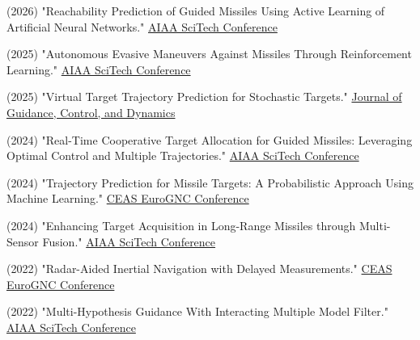 \documentclass[11pt,a4paper]{article}
\begin{document}
\begin{enumerate}[label=\textbf{[\arabic*]}, leftmargin=0.8cm, itemsep=3pt]

    \item (2026) "Reachability Prediction of Guided Missiles Using Active Learning of Artificial Neural Networks." \href{https://arc.aiaa.org/doi/abs/10.2514/6.2026-2166}{AIAA SciTech Conference}
    
    \item (2025) "Autonomous Evasive Maneuvers Against Missiles Through Reinforcement Learning." \href{https://www.researchgate.net/publication/387995943_Autonomous_Evasive_Maneuvers_against_Missiles_through_Reinforcement_Learning}{AIAA SciTech Conference}

    \item (2025) "Virtual Target Trajectory Prediction for Stochastic Targets." \href{https://arxiv.org/pdf/2504.01851}{Journal of Guidance, Control, and Dynamics}
    
    \item (2024) "Real-Time Cooperative Target Allocation for Guided Missiles: Leveraging Optimal Control and Multiple Trajectories." \href{https://arc.aiaa.org/doi/10.2514/6.2025-1907}{AIAA SciTech Conference}

    \item (2024) "Trajectory Prediction for Missile Targets: A Probabilistic Approach Using Machine Learning." \href{https://www.researchgate.net/publication/381520100_Trajectory_Prediction_for_Missile_Targets_A_Probabilistic_Approach_Using_Machine_Learning}{CEAS EuroGNC Conference}
    
    
    \item (2024) "Enhancing Target Acquisition in Long-Range Missiles through Multi-Sensor Fusion." \href{https://www.researchgate.net/publication/377395801_Enhancing_Target_Acquisition_in_Long-Range_Missiles_through_Multi-Sensor_Fusion}{AIAA SciTech Conference}
    
    \item (2022) "Radar-Aided Inertial Navigation with Delayed Measurements." \href{https://www.researchgate.net/publication/360484762_Radar-Aided_Inertial_Navigation_with_Delayed_Measurements}{CEAS EuroGNC Conference}
        
    \item (2022) "Multi-Hypothesis Guidance With Interacting Multiple Model Filter." \href{https://www.researchgate.net/publication/357595202_Multi-Hypothesis_Guidance_With_Interacting_Multiple_Model_Filter}{AIAA SciTech Conference}
    
\end{enumerate}
\end{document}

